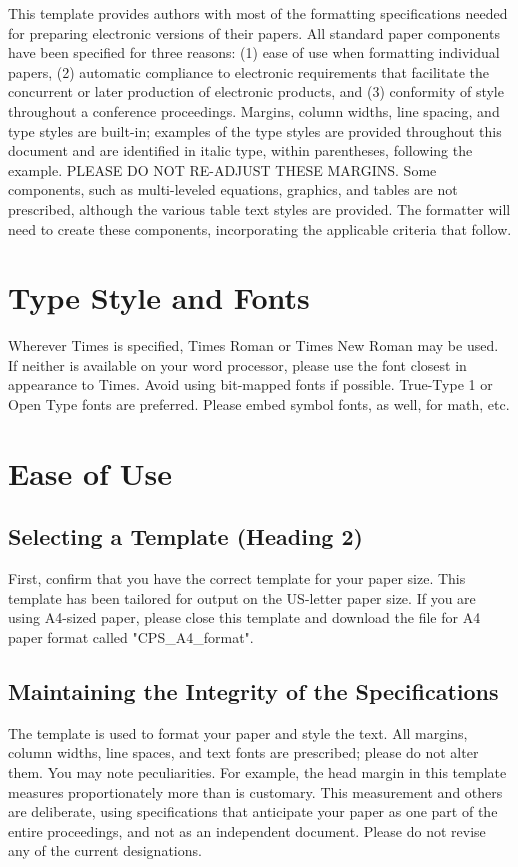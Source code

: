 \documentclass[conference]{IEEEtran}
\begin{document}
This template provides authors with most of the formatting specifications needed for preparing electronic versions of their papers. All standard paper components have been specified for three reasons: (1) ease of use when formatting individual papers, (2) automatic compliance to electronic requirements that facilitate the concurrent or later production of electronic products, and (3) conformity of style throughout a conference proceedings. Margins, column widths, line spacing, and type styles are built-in; examples of the type styles are provided throughout this document and are identified in italic type, within parentheses, following the example. PLEASE DO NOT RE-ADJUST THESE MARGINS. Some components, such as multi-leveled equations, graphics, and tables are not prescribed, although the various table text styles are provided. The formatter will need to create these components, incorporating the applicable criteria that follow.

\section{Type Style and Fonts} 

Wherever Times is specified, Times Roman or Times New Roman may be used. If neither is available on your word processor, please use the font closest in appearance to Times. Avoid using bit-mapped fonts if possible. True-Type 1 or Open Type fonts are preferred. Please embed symbol fonts, as well, for math, etc.

\section{Ease of Use} 

\subsection{Selecting a Template (Heading 2)} 
First, confirm that you have the correct template for your paper size. This template has been tailored for output on the US-letter paper size. If you are using A4-sized paper, please close this template and download the file for A4 paper format called "CPS\_A4\_format".

\subsection{Maintaining the Integrity of the Specifications} 
The template is used to format your paper and style the text. All margins, column widths, line spaces, and text fonts are prescribed; please do not alter them. You may note peculiarities. For example, the head margin in this template measures proportionately more than is customary. This measurement and others are deliberate, using specifications that anticipate your paper as one part of the entire proceedings, and not as an independent document. Please do not revise any of the current designations.
\end{document}
